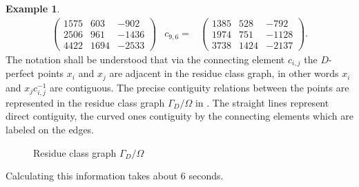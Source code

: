\documentclass[10pt, preprint]{elsarticle}
\theoremstyle{definition}
\newtheorem{example}[theorem]{Example}
\theoremstyle{definition}
\begin{document}
\begin{example}
{\begin{align*}
\begin{pmatrix}
1575 & 603 & -902 \\
2506 & 961 & -1436 \\
4422 & 1694 & -2533
\end{pmatrix}
& c_{9,6}=& \begin{pmatrix}
1385 & 528 & -792 \\
1974 & 751 & -1128 \\
3738 & 1424 & -2137
\end{pmatrix}.
\end{align*}
} 
The notation shall be understood that via the connecting element $c_{i,j}$ the $D$-perfect points $x_i$ and $x_j$ are adjacent in the residue class graph, in other words $x_i$ and $x_jc_{i,j}^{-1}$ are contiguous. The precise contiguity relations between the points are represented in the residue class graph $\Gamma_D/\Omega$ in . The straight lines represent direct contiguity, the curved ones contiguity by the connecting elements which are labeled on the edges.
\begin{center}
\begin{figure}[h!]
                         \label{figResGraph}
                         \caption{Residue class graph $\Gamma_D/\Omega$} 
\end{figure}
\end{center}
Calculating this information takes about $6$ seconds.
\end{example}
\end{document}
